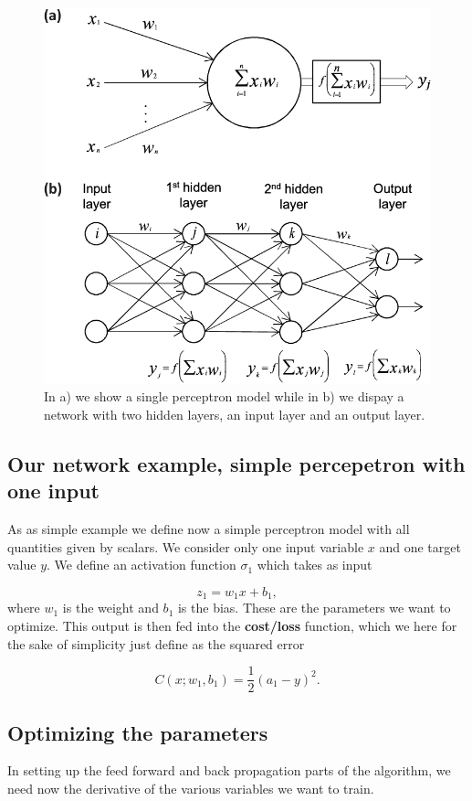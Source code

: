 \documentclass[%
oneside,                 %
final,                   %
10pt]{article}
\begin{document}
\begin{figure}[!ht]  %
  \centerline{\includegraphics[width=0.7\linewidth]{figures/nns.png}}
  \caption{
  In a) we show a single perceptron model while in b) we dispay a network with two  hidden layers, an input layer and an output layer.
  }
\end{figure}

\subsection{Our network example, simple percepetron with one input}

As as simple example we define now a simple perceptron model with
all quantities given by scalars. We consider only one input variable
$x$ and one target value $y$.  We define an activation function
$\sigma_1$ which takes as input

\[
z_1 = w_1x+b_1,
\]
where $w_1$ is the weight and $b_1$ is the bias. These are the
parameters we want to optimize.  This output is then fed into the
\textbf{cost/loss} function, which we here for the sake of simplicity just
define as the squared error

\[
C(x;w_1,b_1)=\frac{1}{2}(a_1-y)^2.
\]

\subsection{Optimizing the parameters}

In setting up the feed forward and back propagation parts of the
algorithm, we need now the derivative of the various variables we want
to train.
\end{document}
